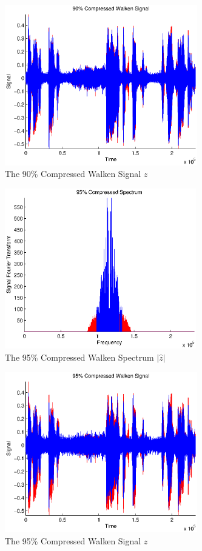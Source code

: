\documentclass{report}
\begin{document}
\begin{figure}
\center
\caption{The 90\% Compressed Walken Signal $z$}
\label{fig:I90Fwak}
\includegraphics[height=7cm]{90fourRec.eps}

\end{figure}

\begin{figure}
\center
\caption{The 95\% Compressed Walken Spectrum $|\hat z|$}
\label{fig:95Fwak}
\includegraphics[height=7cm]{95four.eps}
\end{figure}

\begin{figure}
\center
\caption{The 95\% Compressed Walken Signal $z$}
\label{fig:I95Fwak}
\includegraphics[height=7cm]{95fourRec.eps}

\end{figure}
\end{document}
